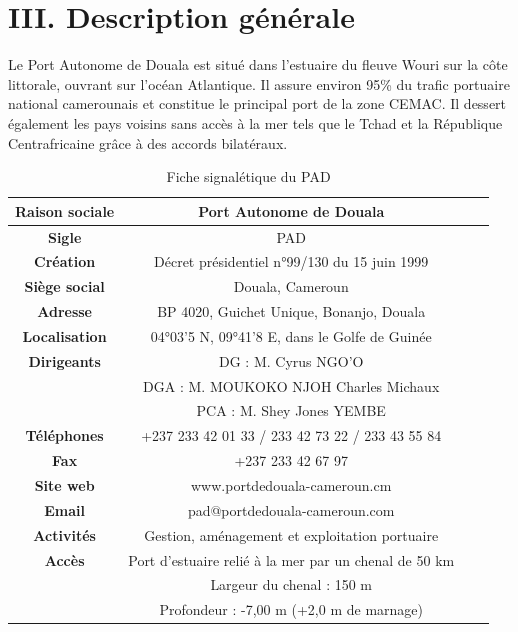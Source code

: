 \documentclass[a4paper,12pt,openany]{report}
\begin{document}
\section*{III. Description générale}

Le Port Autonome de Douala est situé dans l’estuaire du fleuve Wouri sur la côte littorale, ouvrant sur l’océan Atlantique. Il assure environ 95\% du trafic portuaire national camerounais et constitue le principal port de la zone CEMAC. Il dessert également les pays voisins sans accès à la mer tels que le Tchad et la République Centrafricaine grâce à des accords bilatéraux.
	
	\begin{table}[htbp]
		\centering
		\caption{Fiche signalétique du PAD}
		\begin{tabular}{|c|c|c|p{7cm}|}
			\hline
			\textbf{Raison sociale} & Port Autonome de Douala \\
			\hline
			\textbf{Sigle} & PAD \\
			\hline
			\textbf{Création} & Décret présidentiel n°99/130 du 15 juin 1999 \\
			\hline
			\textbf{Siège social} & Douala, Cameroun \\
			\hline
			\textbf{Adresse} & BP 4020, Guichet Unique, Bonanjo, Douala \\
			\hline
			\textbf{Localisation} & 04°03’5 N, 09°41’8 E, dans le Golfe de Guinée \\
			\hline
			\textbf{Dirigeants} & DG : M. Cyrus NGO’O \\
			& DGA : M. MOUKOKO NJOH Charles Michaux \\
			& PCA : M. Shey Jones YEMBE \\
			\hline
			\textbf{Téléphones} & +237 233 42 01 33 / 233 42 73 22 / 233 43 55 84 \\
			\hline
			\textbf{Fax} & +237 233 42 67 97 \\
			\hline
			\textbf{Site web} & www.portdedouala-cameroun.cm \\
			\hline
			\textbf{Email} & pad@portdedouala-cameroun.com \\
			\hline
			\textbf{Activités} & Gestion, aménagement et exploitation portuaire \\
			\textbf{Accès} & Port d’estuaire relié à la mer par un chenal de 50 km \\
			& Largeur du chenal : 150 m \\
			& Profondeur : -7,00 m (+2,0 m de marnage) \\

\end{tabular}
\end{table}
\end{document}
